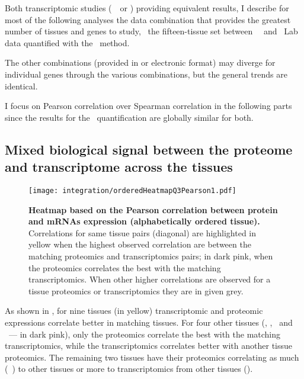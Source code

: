 Both transcriptomic studies (\uhlen\ \etal\ or \gtex)
providing equivalent results,
I describe for most of the following analyses the data combination
that provides the greatest number of tissues and genes to study,
\ie\ the fifteen-tissue set between \uhlen\ \etal\ and \pandey\ Lab data
quantified with the \PPKM\ method.\mybr\

\vspace{-1mm}
The other combinations
(provided in  or electronic format)
may diverge for individual genes through the various combinations,
but the general trends are identical.\mybr\
\vspace{-1mm}

I focus on Pearson correlation over Spearman correlation
in the following parts
since the results for the \PPKM\ quantification are globally similar for both.\mybr\

\subsection{Mixed biological signal between the proteome and transcriptome
across the tissues}
\begin{figure}[!hb]
    \texttt{[image: integration/orderedHeatmapQ3Pearson1.pdf]}\centering
    \vspace{-2mm}
    \caption[Heatmap based on the Pearson correlation between protein and mRNAs
    expression (alphabetically ordered tissue)]{\label{fig:orderedHeatmapPearson}%
    \textbf{Heatmap based on the Pearson correlation between protein and mRNAs
    expression (alphabetically ordered tissue).}
    Correlations for same tissue pairs (diagonal) are highlighted in
    yellow when the highest observed correlation are between the matching proteomics
    and transcriptomics pairs; in dark pink, when the proteomics correlates
    the best with the matching transcriptomics.
    When other higher correlations are observed for a tissue proteomics or transcriptomics
    they are in given grey.}
\end{figure}

As shown in ,
for nine tissues (in yellow) transcriptomic and proteomic expressions correlate
better in matching tissues.
For four other tissues (\hColon, \Lung, \Oesophagus\ and \Urinarybladder\
--- in dark pink),
only the proteomics correlate the best with the matching transcriptomics,
while the transcriptomics correlates better with another tissue proteomics.
The remaining two tissues have their proteomics correlating
as much (\eg\ \Gall) to other tissues or more to transcriptomics
from other tissues (\Rectum).\mybr\

